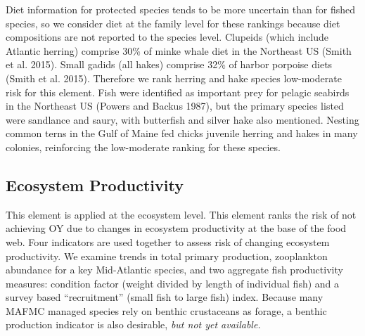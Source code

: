\documentclass[11pt,]{article}
\begin{document}
Diet information for protected species tends to be more uncertain than
for fished species, so we consider diet at the family level for these
rankings because diet compositions are not reported to the species
level. Clupeids (which include Atlantic herring) comprise 30\% of minke
whale diet in the Northeast US (Smith et al. 2015). Small gadids (all
hakes) comprise 32\% of harbor porpoise diets (Smith et al. 2015).
Therefore we rank herring and hake species low-moderate risk for this
element. Fish were identified as important prey for pelagic seabirds in
the Northeast US (Powers and Backus 1987), but the primary species
listed were sandlance and saury, with butterfish and silver hake also
mentioned. Nesting common terns in the Gulf of Maine fed chicks juvenile
herring and hakes in many colonies, reinforcing the low-moderate ranking
for these species.

\subsection{Ecosystem Productivity}\label{ecosystem-productivity}

This element is applied at the ecosystem level. This element ranks the
risk of not achieving OY due to changes in ecosystem productivity at the
base of the food web. Four indicators are used together to assess risk
of changing ecosystem productivity. We examine trends in total primary
production, zooplankton abundance for a key Mid-Atlantic species, and
two aggregate fish productivity measures: condition factor (weight
divided by length of individual fish) and a survey based ``recruitment''
(small fish to large fish) index. Because many MAFMC managed species
rely on benthic crustaceans as forage, a benthic production indicator is
also desirable, \emph{but not yet available.}
\end{document}
